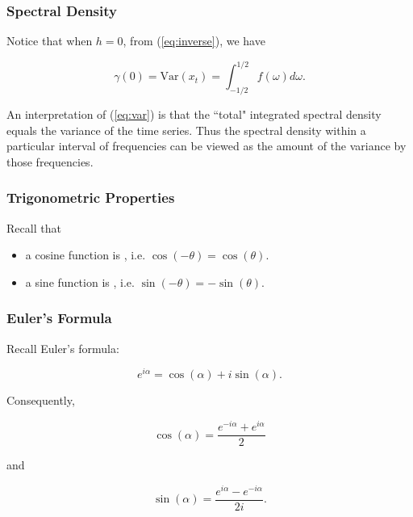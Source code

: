 \documentclass[%
xcolor=pdftex]{beamer}
\begin{document}
\begin{frame}
\frametitle{Spectral Density}


Notice that when $h=0$, from (\ref{eq:inverse}), we have

\begin{equation} \label{eq:var}
\gamma(0) = \mbox{Var}(x_t) = \int^{1/2}_{-1/2} f(\omega) d\omega.
\end{equation}

An interpretation of (\ref{eq:var}) is that the ``total" integrated spectral density equals the variance of the time series.  Thus the spectral density within a particular interval of frequencies can be viewed as the amount of the variance \underline{\hspace{15 mm}} by those frequencies.

\end{frame}


\begin{frame}
\frametitle{Trigonometric Properties}

Recall that

\begin{itemize}
\item a cosine function is \underline{\hspace{8 mm}}, i.e. $\cos(-\theta) = \cos(\theta)$.
\item a sine function is \underline{\hspace{7 mm}}, i.e. $\sin(-\theta) = -\sin(\theta)$.
\end{itemize}

\end{frame}

\begin{frame}
\frametitle{Euler's Formula}

Recall Euler's formula:

\begin{equation} \label{eq:euler}
e^{i \alpha} = \cos (\alpha) + i \sin (\alpha).
\end{equation}

Consequently,

\begin{equation} \label{eq:ecos}
\cos(\alpha) = \frac{e^{-i \alpha} + e^{i \alpha}}{2}
\end{equation}

and

\begin{equation} \label{eq:esin}
\sin(\alpha) = \frac{e^{i \alpha} - e^{-i \alpha}}{2i}.
\end{equation}


\end{frame}
\end{document}
